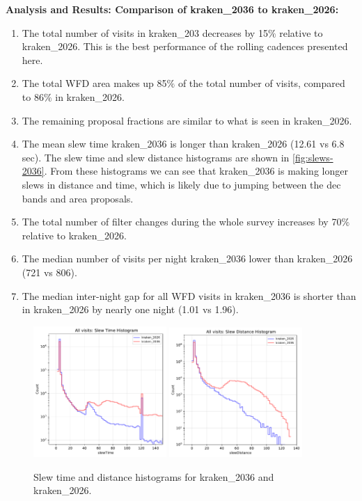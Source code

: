 \documentclass[DM,authoryear,toc]{lsstdoc}
\begin{document}
\textbf{Analysis and Results: Comparison of kraken\_2036 to kraken\_2026:}

\begin{enumerate}
\item The total number of visits in kraken\_203 decreases by 15$\%$ relative to kraken\_2026. This is the best performance
of the rolling cadences presented here.
\item The total WFD area makes up 85$\%$ of the total number of visits, compared to 86$\%$ in kraken\_2026.
\item The remaining proposal fractions are similar to what is seen in kraken\_2026.
\item The mean slew time kraken\_2036 is longer than kraken\_2026 (12.61 vs 6.8 sec). The slew time and slew distance
histograms are shown in \autoref{fig:slews-2036}. From these histograms we can see that kraken\_2036 is making longer
slews in distance and time, which is likely due to jumping between the dec bands and area proposals.
\item The total number of filter changes during the whole survey increases by 70$\%$ relative to kraken\_2026.
\item The median number of visits per night kraken\_2036 lower than kraken\_2026 (721 vs 806).
\item The median inter-night gap for all WFD visits in kraken\_2036 is shorter than in kraken\_2026 by nearly one night (1.01 vs 1.96).
\end{enumerate}


\begin{figure}[ht]
\centering
\includegraphics[width=0.45\textwidth]{figures/kraken_2026_kraken_2036_Slew_Time_Histogram_All_visits_ONED_ComboBinnedData.pdf}
\includegraphics[width=0.45\textwidth]{figures/kraken_2026_kraken_2036_Slew_Distance_Histogram_All_visits_ONED_ComboBinnedData.pdf}
\caption{Slew time and distance histograms for kraken\_2036 and  kraken\_2026.}
\label{fig:slews-2036}
\end{figure}
\end{document}

